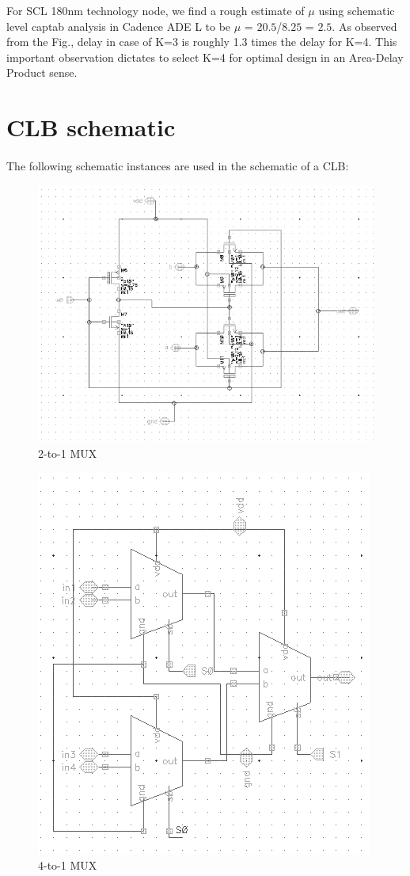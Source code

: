 For SCL 180nm technology node, we find a rough estimate of $\mu$ using schematic level captab analysis in Cadence ADE L to be $\mu$ = $20.5$/$8.25$ = $2.5$. As observed from the Fig., delay in case of K=3 is roughly 1.3 times the delay for K=4. This important observation dictates to select K=4 for optimal design in an Area-Delay Product sense. 
\section{CLB schematic}
\paragraph{}
The following schematic instances are used in the schematic of a CLB:

\begin{figure}[H]
\centering
\includegraphics[scale=0.7]{2_1_mux.png}
\caption{2-to-1 MUX}
\label{fig:Figure}
\end{figure}
\begin{figure}[H]
\centering
\includegraphics[scale=0.7]{4_1_mux.png}
\caption{4-to-1 MUX}
\label{fig:Figure}
\end{figure}

